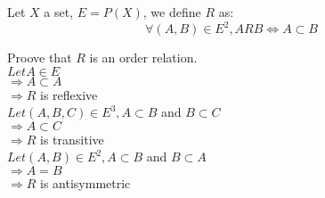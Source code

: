 \documentclass{article}
\begin{document}
\noindent Let $X$ a set, $E = P(X)$, we define $R$ as:\\
\[
\forall (A, B) \in E^2, ARB \iff A \subset B
\]

\noindent Proove that $R$ is an order relation.\\

\noindent $Let A \in E$\\
$\Rightarrow A \subset A$\\
$\Rightarrow R$ is reflexive\\

\noindent $Let (A, B, C) \in E^3, A \subset B $ and 
$B \subset C$\\
$\Rightarrow A \subset C$\\
$\Rightarrow R$ is transitive\\

\noindent $Let (A, B) \in E^2, A \subset B $ and
$B \subset A$\\
$\Rightarrow A = B$\\
$\Rightarrow R$ is antisymmetric\\
\end{document}
